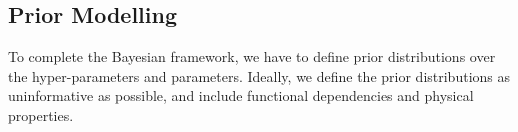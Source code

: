 
\subsection{Prior Modelling}
\label{subsec:PriorModelO3}
To complete the Bayesian framework, we have to define prior distributions over the hyper-parameters and parameters.
Ideally, we define the prior distributions as uninformative as possible, and include functional dependencies and physical properties.

